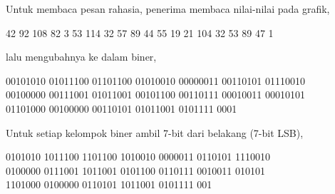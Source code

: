 \documentclass{article}
\begin{document}

Untuk membaca pesan rahasia, penerima membaca nilai-nilai pada grafik,

42 92 108 82 3 53 114 32 57 89 44 55 19 21 104 32 53 89 47 1

lalu mengubahnya ke dalam biner,

00101010 01011100 01101100 01010010 00000011 00110101 01110010\\
00100000 00111001 01011001 00101100 00110111 00010011 00010101\\
01101000 00100000 00110101 01011001 0101111 0001

Untuk setiap kelompok biner ambil 7-bit dari belakang (7-bit LSB),

0101010 1011100 1101100 1010010 0000011 0110101 1110010\\
0100000 0111001 1011001 0101100 0110111 0010011 010101\\
1101000 0100000 0110101 1011001 0101111 001
\end{document}
